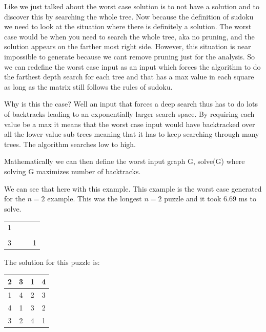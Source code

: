 \documentclass{sig-alternate}
\begin{document}
Like we just talked about the worst case solution is to not have a solution and to discover this by searching the whole tree. Now because the definition of sudoku we need to look at the situation where there is definitely a solution. The worst case would be when you need to search the whole tree, aka no pruning, and the solution appears on the farther most right side. However, this situation is near impossible to generate because we cant remove pruning just for the analysis. So we can redefine the worst case input as an input which forces the algorithm to do the farthest depth search for each tree and that has a max value in each square as long as the matrix still follows the rules of sudoku. 

Why is this the case? Well an input that forces a deep search thus has to do lots of backtracks leading to an exponentially larger search space. By requiring each value be a max it means that the worst case input would have backtracked over all the lower value sub trees meaning that it has to keep searching through many trees. The algorithm searches low to high. 

	Mathematically we can then define the worst input graph G, solve(G) where solving G maximizes number of backtracks. 
    
    We can see that here with this example. This example is the worst case generated for the $n=2$ example. This was the longest $n=2$ puzzle and it took 6.69 ms to solve.
    
\begin{center}
  \begin{tabular}{ | c | c | c | c | }
    \hline
		& & & \\ \hline
        1 & & &  \\ \hline
        & & & \\ \hline
        3 & & & 1 \\
    \hline
  \end{tabular}
\end{center}

The solution for this puzzle is: 

\begin{center}
  \begin{tabular}{ | c | c | c | c | }
    \hline
		2 & 3 & 1 & 4\\ \hline
        1 & 4 & 2 & 3 \\ \hline
        4 & 1 & 3 & 2\\ \hline
        3 & 2 & 4 & 1 \\
    \hline
  \end{tabular}
\end{center}
\end{document}
